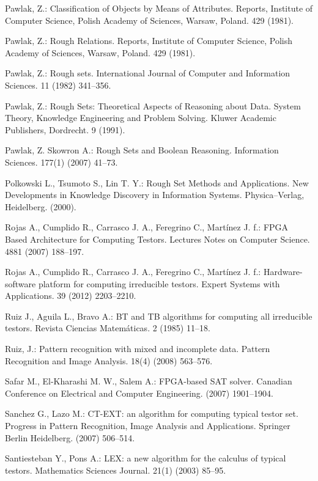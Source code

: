 \documentclass[11pt]{article}   %
\begin{document}
\begin{thebibliography}{}
	Pawlak, Z.: 
	Classification of Objects by Means of Attributes.
	Reports, Institute of Computer Science, Polish Academy of Sciences, Warsaw, Poland. 429 (1981).

	Pawlak, Z.:
	Rough Relations.
	Reports, Institute of Computer Science, Polish Academy of Sciences, Warsaw, Poland. 429 (1981).

	Pawlak, Z.: 
	Rough sets.
	International Journal of Computer and Information Sciences. 11 (1982) 341--356.

	Pawlak, Z.: 
	Rough Sets: Theoretical Aspects of Reasoning about Data.
	System Theory, Knowledge Engineering and Problem Solving. 
	Kluwer Academic Publishers, Dordrecht. 9 (1991).
	
	Pawlak, Z. Skowron A.: 
	Rough Sets and Boolean Reasoning.
	Information Sciences. 177(1) (2007) 41--73.
	
	Polkowski L., Tsumoto S., Lin T. Y.: 
	Rough Set Methods and Applications. 
	New Developments in Knowledge Discovery in Information Systems.
	Physica–Verlag, Heidelberg. (2000).

	Rojas A., Cumplido R., Carrasco J. A., Feregrino C., Mart\'inez J. f.:
	FPGA Based Architecture for Computing Testors. 
	Lectures Notes on Computer Science. 4881 (2007) 188--197.

	Rojas A., Cumplido R., Carrasco J. A., Feregrino C., Mart\'inez J. f.:
	Hardware-software platform for computing irreducible testors. 
	Expert Systems with Applications. 39 (2012) 2203--2210.

	Ruiz J., Aguila L., Bravo A.:
	BT and TB algorithms for computing all irreducible testors. 
	Revista Ciencias Matem\'aticas. 2 (1985) 11--18.
	
	Ruiz, J.:
 	Pattern recognition with mixed and incomplete data. 
 	Pattern Recognition and Image Analysis. 18(4) (2008) 563--576.
 	
	Safar M., El-Kharashi M. W., Salem A.:
	FPGA-based SAT solver. 
	Canadian Conference on Electrical and Computer Engineering. (2007) 1901--1904. 
	
 	Sanchez G., Lazo M.:
 	CT-EXT: an algorithm for computing typical testor set.
 	Progress in Pattern Recognition, Image Analysis and Applications. 
 	Springer Berlin Heidelberg. (2007) 506--514.
 
	Santiesteban Y., Pons A.:
	LEX: a new algorithm for the calculus of typical testors.
	Mathematics Sciences Journal. 21(1) (2003) 85--95.
	

\end{thebibliography}
\end{document}
